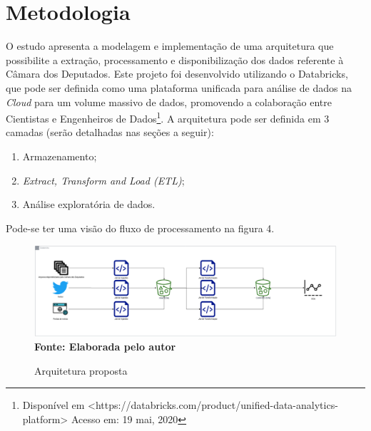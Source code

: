 \chapter{Metodologia}
\label{metodologia}
O estudo apresenta a modelagem e implementação de uma arquitetura que possibilite a extração, processamento e disponibilização dos dados referente à Câmara dos Deputados. Este projeto foi desenvolvido utilizando o Databricks, que pode ser definida como uma plataforma unificada para análise de dados na \textit{Cloud} para um volume massivo de dados, promovendo a colaboração entre Cientistas e Engenheiros de Dados\footnote{Disponível em <https://databricks.com/product/unified-data-analytics-platform> Acesso em: 19 mai, 2020}.
A arquitetura pode ser definida em 3 camadas (serão detalhadas nas seções a seguir):
\begin{enumerate} 
 \item [1)] Armazenamento;
 \item [2)] \textit{Extract, Transform and Load (ETL)};
 \item [3)] Análise exploratória de dados.
\end{enumerate} 

Pode-se ter uma visão do fluxo de processamento na figura 4.

\begin{figure}[H]
	\centering	
	\caption[\hspace{0.1cm}Arquitetura proposta]{Arquitetura proposta}
	  \vspace{-0.4cm}
	\includegraphics[width=.8\textwidth]{figuras/tcc_arch.png}
	 \vspace{-0.3cm}
	\\\textbf{\footnotesize Fonte: Elaborada pelo autor}
	\label{fig:tela1}
\end{figure}

